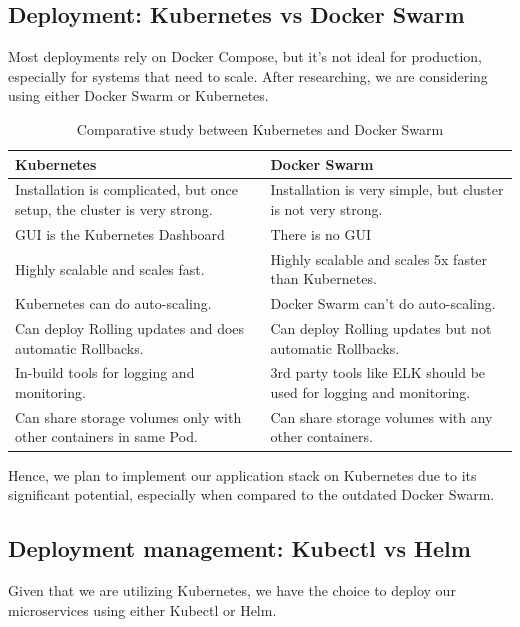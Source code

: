 \subsection{Deployment: Kubernetes vs Docker Swarm}
Most deployments rely on Docker Compose, but it's not ideal for production, especially for systems that need to scale. After researching, we are considering using either Docker Swarm or Kubernetes.


\begin{table}[h!]
  \centering
  \renewcommand{\arraystretch}{1.5} 
  \caption{Comparative study between Kubernetes and Docker Swarm }
  \label{tab: comparative_study_between_kubernetes_and_Docker_swarm}
  \begin{tabularx}{\textwidth}{|>{\centering\arraybackslash}X|>{\centering\arraybackslash}X|}
      \hline
      \rowcolor{blue!20} 
      \textbf{Kubernetes} & \textbf{Docker Swarm} \\
      \hline
      Installation is complicated, but once setup, the cluster is very strong. & Installation is very simple, but cluster is not very strong. \\
      \hline
      GUI is the Kubernetes Dashboard & There is no GUI \\
      \hline
      Highly scalable and scales fast. & Highly scalable and scales 5x faster than Kubernetes.  \\
      \hline
      Kubernetes can do auto-scaling. & Docker Swarm can't do auto-scaling.  \\
      \hline
      Can deploy Rolling updates and does automatic Rollbacks. & Can deploy Rolling updates but not automatic Rollbacks.   \\
      \hline
      In-build tools for logging and monitoring. & 3rd party tools like ELK should be used for logging and monitoring.  \\
      \hline
      Can share storage volumes only with other containers in same Pod. & Can share storage volumes with any other containers.  \\
      \hline
  \end{tabularx}
\end{table}
Hence, we plan to implement our application stack on Kubernetes due to its significant potential, especially when compared to the outdated Docker Swarm.

\newpage
\subsection{Deployment management: Kubectl vs Helm}
Given that we are utilizing Kubernetes, we have the choice to deploy our microservices using either Kubectl or Helm.


